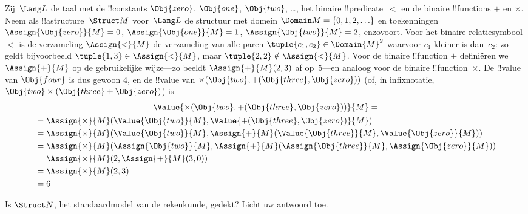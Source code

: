 \documentclass[openany]{memoir}
\begin{document}
\begin{ex}
Zij~$\Lang L$ de taal met de !!{constant}s $\Obj{zero}$,
$\Obj{one}$, $\Obj{two}$, \dots, het binaire !!{predicate}~$<$ en de
binaire !!{function}s $+$ en $\times$. Neem als !!a{structure}~$\Struct
M$ voor~$\Lang L$ de structuur met domein $\Domain M = \{0, 1, 2, \ldots
\}$ en toekenningen $\Assign{\Obj{zero}}{M} = 0$,
$\Assign{\Obj{one}}{M} = 1$, $\Assign{\Obj{two}}{M} = 2$, enzovoort.
Voor het binaire relatiesymbool $<$ is de verzameling $\Assign{<}{M}$
de verzameling van alle paren $\tuple{c_1, c_2} \in \Domain{M}^2$
waarvoor $c_1$ kleiner is dan~$c_2$: zo geldt bijvoorbeeld
$\tuple{1, 3} \in \Assign{<}{M}$, maar $\tuple{2, 2} \notin
\Assign{<}{M}$. Voor de binaire !!{function} $+$ definiëren we
$\Assign{+}{M}$ op de gebruikelijke wijze---zo beeldt
$\Assign{+}{M}(2,3)$ af op~$5$---en analoog voor de binaire
!!{function}~$\times$. De !!{value} van $\Obj{four}$ is dus gewoon
$4$, en de !!{value} van $\times(\Obj{two},
+(\Obj{three},\Obj{zero}))$ (of, in infixnotatie, $\Obj{two} \times
(\Obj{three} + \Obj{zero})$) is
\begin{multline*}
\Value{\times(\Obj{two}, +(\Obj{three},\Obj{zero}))}{M} =\\
\begin{aligned}
& =\Assign{\times}{M}(\Value{\Obj{two}}{M}, \Value{+(\Obj{three}, \Obj{zero})}{M})\\
& = \Assign{\times}{M}(\Value{\Obj{two}}{M}, \Assign{+}{M}(\Value{\Obj{three}}{M},
\Value{\Obj{zero}}{M})) \\
& = \Assign{\times}{M}(\Assign{\Obj{two}}{M}, \Assign{+}{M}(\Assign{\Obj{three}}{M},
\Assign{\Obj{zero}}{M})) \\
& = \Assign{\times}{M}(2, \Assign{+}{M}(3, 0)) \\
& = \Assign{\times}{M}(2, 3) \\
& = 6
\end{aligned}
\end{multline*}
\end{ex}

\begin{prob}
Is $\Struct N$, het standaardmodel van de rekenkunde, gedekt? Licht uw
antwoord toe.
\end{prob}
\endgroup

\begingroup
\def\olfilename{OLP-0163}
\def\olfilepath{content/first-order-logic/syntax-and-semantics/}
\hypertarget{unit-OLP-0163}{}
\end{document}
